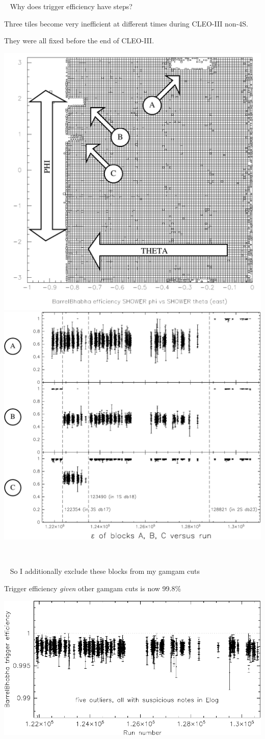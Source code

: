 \documentclass[landscape]{article}
\newenvironment{slide}{\mbox{ }\vfill}{\vfill \mbox{ } \pagebreak}
\begin{document}
\begin{slide}
  Why does trigger efficiency have steps?

  \vfill Three tiles become very inefficient at different times during
  CLEO-III non-4S.

  \vfill They were all fixed before the end of CLEO-III.

  \vfill
  \begin{center}
    \includegraphics[width=0.45\linewidth]{plottrig_blocks2.pdf} \hfill
    \includegraphics[width=0.45\linewidth]{plottrig_blocks_vrun2.pdf}
  \end{center}
\end{slide}

\begin{slide}
  So I additionally exclude these blocks from my gamgam cuts

  \vfill Trigger efficiency {\it given} other gamgam cuts is now
  99.8\%

  \vfill
  \begin{center}
    \includegraphics[width=\linewidth]{afterexclude.pdf}
  \end{center}
\end{slide}
\end{document}
